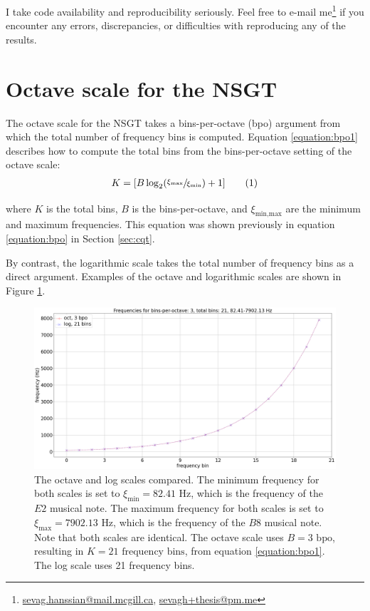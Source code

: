 \documentclass[report.tex]{subfiles}
\begin{document}
\begin{appendices}
I take code availability and reproducibility seriously. Feel free to e-mail me\footnote{\href{mailto:sevag.hanssian@mail.mcgill.ca}{sevag.hanssian@mail.mcgill.ca}, \href{mailto:sevagh+thesis@pm.me}{sevagh+thesis@pm.me}} if you encounter any errors, discrepancies, or difficulties with reproducing any of the results.

\newpagefill

\section{Octave scale for the NSGT}
\label{appendix:octscale}

The octave scale for the NSGT takes a bins-per-octave (bpo) argument from which the total number of frequency bins is computed. Equation \eqref{equation:bpo1} describes how to compute the total bins from the bins-per-octave setting of the octave scale:
\begin{align}
	K = [B \log_{2}(\sfrac{\xi_{\text{max}}}{\xi_{\text{min}}}) + 1]\tag{1}\label{equation:bpo1}
\end{align}

where $K$ is the total bins, $B$ is the bins-per-octave, and $\xi_{\text{min,max}}$ are the minimum and maximum frequencies. This equation was shown previously in equation \eqref{equation:bpo} in Section \ref{sec:cqt}.

By contrast, the logarithmic scale takes the total number of frequency bins as a direct argument. Examples of the octave and logarithmic scales are shown in Figure \ref{fig:octvlog}.

\begin{figure}[ht]
	\centering
	\includegraphics[width=\textwidth]{./images-freqscales/log_vs_oct.png}
	\caption{The octave and log scales compared. The minimum frequency for both scales is set to $\xi_{\text{min}} = 82.41 \text{ Hz}$, which is the frequency of the $E2$ musical note. The maximum frequency for both scales is set to $\xi_{\text{max}} = 7902.13 \text{ Hz}$, which is the frequency of the $B8$ musical note. Note that both scales are identical. The octave scale uses $B = 3 \text{ bpo}$, resulting in $K = 21 \text{ frequency bins}$, from equation \eqref{equation:bpo1}. The log scale uses 21 frequency bins.}
	\label{fig:octvlog}
\end{figure}


\end{appendices}
\end{document}
